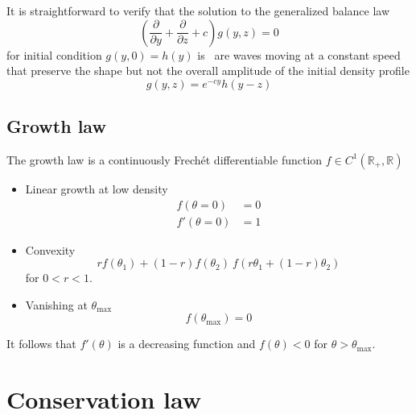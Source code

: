 \documentclass[12pt]{amsart}
\begin{document}
It is straightforward to verify that the
solution to the generalized balance law 
\begin{equation}
  \left(\frac{\partial}{\partial y} + 
  \frac{\partial}{\partial z} + c\right)g(y, z) = 0
  \label{eq:homogeneous_conservation_law}
\end{equation}
for initial condition $g(y, 0) = h(y)$ is~\cite[Equation
  4.2.1.1]{PolyaninSaitsevMoussiaux:2002} are waves moving at a
constant speed that preserve the shape but not the overall amplitude
of the initial density profile
\begin{equation}
  g(y, z) = e^{-cy}h(y-z)
  \label{eq:homogeneous_conservation_solution}
\end{equation}
 

\subsection{Growth law}

The growth law is a continuously Frech\'et differentiable function $f \in
C^{1}\left(\mathbb{R}_{+}, \mathbb{R}\right)$
\begin{itemize}
\item Linear growth at low density
  \begin{align}
    f(\theta=0) &= 0 \\
    f'(\theta = 0) &= 1
  \end{align}
\item Convexity
  \begin{equation}
    rf(\theta_1) + (1-r)f(\theta_2) \ f\left(r\theta_1 + (1-r)\theta_2\right)
  \end{equation}
  for $0 < r < 1$.
\item Vanishing at $\theta_{\text{max}}$
  \begin{equation}
    f(\theta_{\text{max}}) = 0
  \end{equation}
\end{itemize}

It follows that $f'(\theta)$ is a decreasing function and $f(\theta) <
0$ for $\theta>\theta_{\text{max}}$.  


\section{Conservation law}
\end{document}
